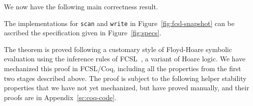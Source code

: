 \begin{comment}

We consider the first item: by Lemma~\ref{lem:inspect}, if
$\aux{inspect}\ t_x\ t_y\ \ordlist\ \C = {\sf Yes}\ x\ t'$ then $t'$
is the yellow timestamp of $\histx$. Then, all elements $t$ in the
chain $t' \tle t \tleq t_y$ belong to $\histy$, by virtue of $t_y$
being yellow or the last green in $\histy$ and
Invariants~\ref{inv:color} and~\ref{inv:redzone}. Thus, in $\ordlist'
= \aux{push}\ t'\ t_y\ \ordlist$, $\forall\ t' \in t_x \tleP t' \tleP
t_y\ldot. t' \in {\histy'}$, hence $(r_x,r_y)$ is a valid snapshot by
$\tleqP$. As for the second item, the proof of the preservation of
most invariants is quite straightforwards, the crux of the matter
being the observation that all $t$ in the chain $t' \tle t
\tle t_y$ are {\it overlapping} and, as a result, changing the linking
of $t'$ in the logical order does not contradict
Proposition~\ref{inv:overlap}.
\end{comment}


We now have the following main correctness result.
\begin{theorem}\label{thm:specs}
The implementations for {\tt scan} and {\tt write} in
Figure~\ref{fig:fcsl-snapshot} can be ascribed the specification given
in Figure~\ref{fig:specs}.
\end{theorem}
%
The theorem is proved following a customary style of Floyd-Hoare
symbolic evaluation using the inference rules of
FCSL~\cite{Nanevski-al:ESOP14}, a variant of Hoare logic. We have
mechanized this proof in FCSL/Coq, including all the properties from
the first two stages described above. The proof is subject to the
following helper stability properties that we have not yet mechanized,
but have proved manually, and their proofs are in
Appendix~\ref{sc:coq-code}.

